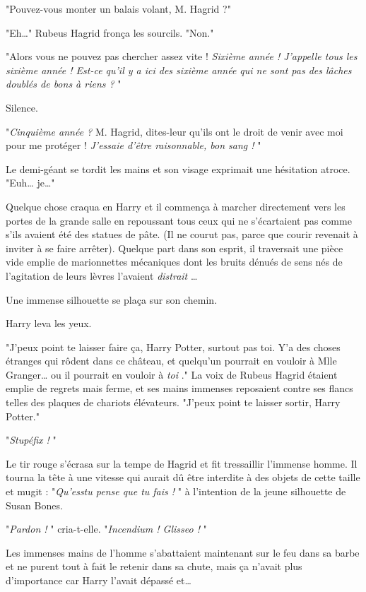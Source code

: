 "Pouvez-vous monter un balais volant, M. Hagrid ?"

"Eh…" Rubeus Hagrid fronça les sourcils. "Non."

"Alors vous ne pouvez pas chercher assez vite ! \emph{Sixième année ! J'appelle tous les sixième année ! Est-ce qu'il y a ici des sixième année qui ne sont pas des lâches doublés de bons à riens ?} "

Silence.

"\emph{Cinquième année ?}  M. Hagrid, dites-leur qu'ils ont le droit de venir avec moi pour me protéger ! \emph{J'essaie d'être raisonnable, bon sang !} "

Le demi-géant se tordit les mains et son visage exprimait une hésitation atroce. "Euh… je…"

Quelque chose craqua en Harry et il commença à marcher directement vers les portes de la grande salle en repoussant tous ceux qui ne s'écartaient pas comme s'ils avaient été des statues de pâte. (Il ne courut pas, parce que courir revenait à inviter à se faire arrêter). Quelque part dans son esprit, il traversait une pièce vide emplie de marionnettes mécaniques dont les bruits dénués de sens nés de l'agitation de leurs lèvres l'avaient \emph{distrait} …

Une immense silhouette se plaça sur son chemin.

Harry leva les yeux.

"J'peux point te laisser faire ça, Harry Potter, surtout pas toi. Y'a des choses étranges qui rôdent dans ce château, et quelqu'un pourrait en vouloir à Mlle Granger… ou il pourrait en vouloir à \emph{toi} ." La voix de Rubeus Hagrid étaient emplie de regrets mais ferme, et ses mains immenses reposaient contre ses flancs telles des plaques de chariots élévateurs. "J'peux point te laisser sortir, Harry Potter."

"\emph{Stupéfix !} "

Le tir rouge s'écrasa sur la tempe de Hagrid et fit tressaillir l'immense homme. Il tourna la tête à une vitesse qui aurait dû être interdite à des objets de cette taille et mugit : "\emph{Qu'esstu pense que tu fais !} " à l'intention de la jeune silhouette de Susan Bones.

"\emph{Pardon !} " cria-t-elle. "\emph{Incendium ! Glisseo !} "

Les immenses mains de l'homme s'abattaient maintenant sur le feu dans sa barbe et ne purent tout à fait le retenir dans sa chute, mais ça n'avait plus d'importance car Harry l'avait dépassé et…

